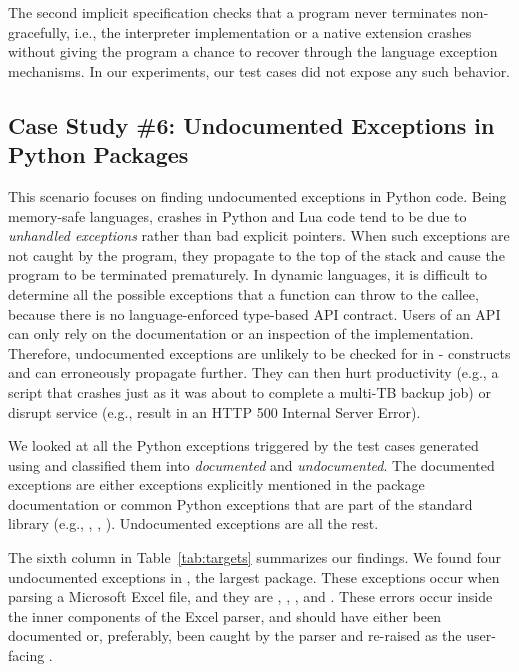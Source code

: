 The second implicit specification checks that a program never terminates non-gracefully, i.e., the interpreter implementation or a native extension crashes without giving the program a chance to recover through the language exception mechanisms.  In our experiments, our test cases did not expose any such behavior.


\subsection{Case Study \#6: Undocumented Exceptions in Python Packages}
\label{sec:eval:undoc-except}

This scenario focuses on finding undocumented exceptions in Python code.
%
Being memory-safe languages, crashes in Python and Lua code tend to be due to \emph{unhandled exceptions} rather than bad explicit pointers.  When such exceptions are not caught by the program, they propagate to the top of the stack and cause the program to be terminated prematurely. 
%
In dynamic languages, it is difficult to determine all the possible exceptions that a function can throw to the callee, because there is no language-enforced type-based API contract.  Users of an API can only rely on the documentation or an inspection of the implementation.  Therefore, undocumented exceptions are unlikely to be checked for in - constructs and can erroneously propagate further.
%
They can then hurt productivity (e.g., a script that crashes just as it was about to complete a multi-TB backup job) or disrupt service (e.g., result in an HTTP 500 Internal Server Error).

We looked at all the Python exceptions triggered by the test cases generated using \chef and classified them into \emph{documented} and \emph{undocumented}.  The documented exceptions are either exceptions explicitly mentioned in the package documentation or common Python exceptions that are part of the standard library (e.g., , , ).  Undocumented exceptions are all the rest.

The sixth column in Table~\ref{tab:targets} summarizes our findings.  We found four undocumented exceptions in , the largest package.  These exceptions occur when parsing a Microsoft Excel file, and they are , , , and .  These errors occur inside the inner components of the Excel parser, and should have either been documented or, preferably, been caught by the parser and re-raised as the user-facing .

